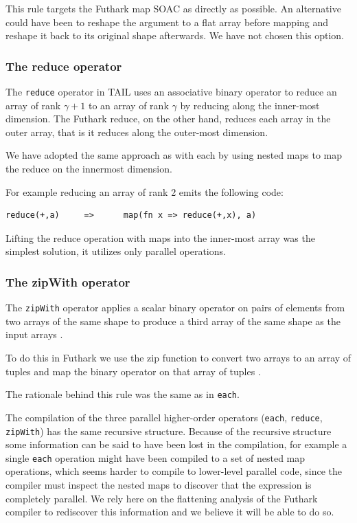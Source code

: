 \documentclass[11pt]{article}
\begin{document}
This rule targets the Futhark map SOAC as directly as possible. An alternative could have been to reshape the
argument to a flat array before mapping and reshape it back to its original shape afterwards.
We have not chosen this option.

\subsubsection{The reduce operator}

The {\tt reduce} operator in TAIL uses an associative binary operator to reduce an array of rank
$\gamma+1$ to an array of rank $\gamma$ by reducing along the inner-most dimension\cite{ElsmanDybdal:Array:2014}.
The Futhark reduce, on the other hand, reduces each array in the outer array, that is it reduces along the outer-most dimension\cite{TroelsHenriksen}.
 
We have adopted the same approach as with each by using nested maps to map the reduce on the innermost dimension.
 
For example reducing an array of rank 2 emits the following code:
 
\begin{lstlisting}[numbers=none,frame=none]
reduce(+,a)     =>      map(fn x => reduce(+,x), a)
\end{lstlisting}

Lifting the reduce operation with maps into the inner-most array was the simplest solution, it utilizes only parallel operations.

\subsubsection{The zipWith operator}
The {\tt zipWith} operator applies a scalar binary operator on pairs of elements from two arrays of the same shape to
produce a third array of the same shape as the input arrays \cite{ElsmanDybdal:Array:2014}.
 
To do this in Futhark we use the zip function to convert two arrays to an array of tuples and map the binary operator on that array of tuples \cite{TroelsHenriksen}.

The rationale behind this rule was the same as in {\tt each}.

The compilation of the three parallel higher-order operators ({\tt each}, {\tt reduce}, {\tt zipWith}) has the same recursive structure.
Because of the recursive structure some information can be said to have been lost
in the compilation, for example a single {\tt each} operation might have been compiled to a set of nested map operations,
which seems harder to compile to lower-level parallel code, since the compiler must inspect the nested maps to discover that the expression is completely parallel.
We rely here on the flattening analysis of the Futhark compiler to rediscover this information and we believe it will be able to do so.
\end{document}
